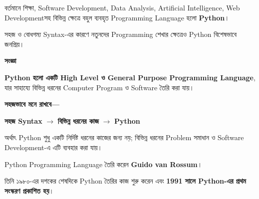 
বর্তমানে শিক্ষা, Software Development, Data Analysis,
Artificial Intelligence, Web Developmentসহ বিভিন্ন ক্ষেত্রে
বহুল ব্যবহৃত Programming Language হলো \textbf{Python}।

সহজ ও বোধগম্য Syntax-এর কারণে নতুনদের Programming শেখার
ক্ষেত্রেও Python বিশেষভাবে জনপ্রিয়।



\begin{definitionbox}

\textbf{\color{darkTeal}সংজ্ঞা}

\textbf{Python হলো একটি High Level ও General Purpose
Programming Language}, যার সাহায্যে বিভিন্ন ধরনের
Computer Program ও Software তৈরি করা যায়।

\end{definitionbox}

\textbf{সহজভাবে মনে রাখবে—}

\begin{center}

\textbf{সহজ Syntax}
\(\longrightarrow\)
\textbf{বিভিন্ন ধরনের কাজ}
\(\longrightarrow\)
\textbf{Python}

\end{center}

অর্থাৎ Python শুধু একটি নির্দিষ্ট ধরনের কাজের জন্য নয়;
বিভিন্ন ধরনের Problem সমাধান ও Software Development-এ
এটি ব্যবহার করা যায়।



Python Programming Language তৈরি করেন
\textbf{Guido van Rossum}।

তিনি ১৯৮০-এর দশকের শেষদিকে Python তৈরির কাজ শুরু করেন এবং
\textbf{1991 সালে Python-এর প্রথম সংস্করণ প্রকাশিত হয়}।

\medskip

